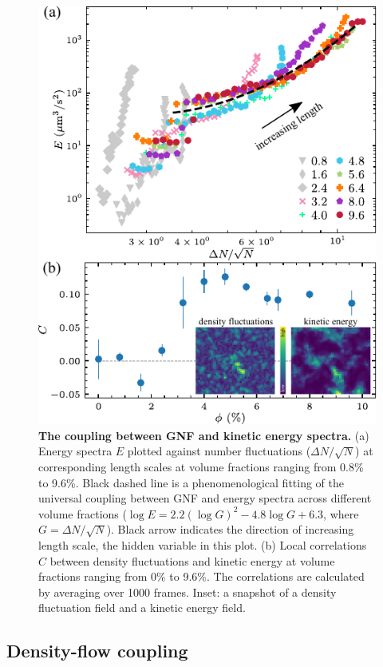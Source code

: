 \begin{figure}[!]
\begin{center}
\includegraphics[width=4.5in]{figs/5-GNF/6.pdf}
\caption[The coupling between GNF and kinetic energy spectra]
{
\textbf{The coupling between GNF and kinetic energy spectra.}
(a) Energy spectra $E$ plotted against number fluctuations ($\Delta N/\sqrt N$) at corresponding length scales at volume fractions ranging from 0.8\% to 9.6\%. Black dashed line is a phenomenological fitting of the universal coupling between GNF and energy spectra across different volume fractions ($\log E = 2.2 (\log G)^2 - 4.8 \log G + 6.3$, where $G=\Delta N/\sqrt N$). Black arrow indicates the direction of increasing length scale, the hidden variable in this plot.
(b) Local correlations $C$ between density fluctuations and kinetic energy at volume fractions ranging from 0\% to 9.6\%. The correlations are calculated by averaging over 1000 frames. Inset: a snapshot of a density fluctuation field and a kinetic energy field.
}
\label{fig:GNF-energy-spectra-correlation}
\end{center}
\end{figure}


\subsection{Density-flow coupling}

